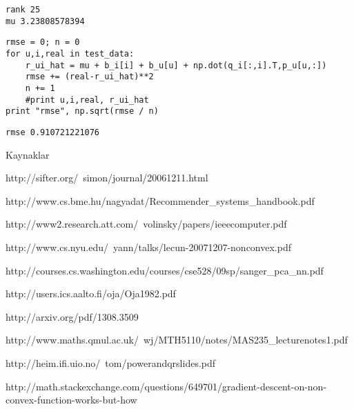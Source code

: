 \documentclass[12pt,fleqn]{article}\usepackage{../common}
\begin{document}
\begin{verbatim}
rank 25
mu 3.23808578394
\end{verbatim}


\begin{verbatim}
rmse = 0; n = 0
for u,i,real in test_data:
    r_ui_hat = mu + b_i[i] + b_u[u] + np.dot(q_i[:,i].T,p_u[u,:])
    rmse += (real-r_ui_hat)**2
    n += 1
    #print u,i,real, r_ui_hat
print "rmse", np.sqrt(rmse / n)
\end{verbatim}

\begin{verbatim}
rmse 0.910721221076
\end{verbatim}










Kaynaklar

http://sifter.org/~simon/journal/20061211.html

http://www.cs.bme.hu/nagyadat/Recommender_systems_handbook.pdf

http://www2.research.att.com/~volinsky/papers/ieeecomputer.pdf

http://www.cs.nyu.edu/~yann/talks/lecun-20071207-nonconvex.pdf

http://courses.cs.washington.edu/courses/cse528/09sp/sanger_pca_nn.pdf

http://users.ics.aalto.fi/oja/Oja1982.pdf

http://arxiv.org/pdf/1308.3509

http://www.maths.qmul.ac.uk/~wj/MTH5110/notes/MAS235_lecturenotes1.pdf

http://heim.ifi.uio.no/~tom/powerandqrslides.pdf

http://math.stackexchange.com/questions/649701/gradient-descent-on-non-convex-function-works-but-how
\end{document}
